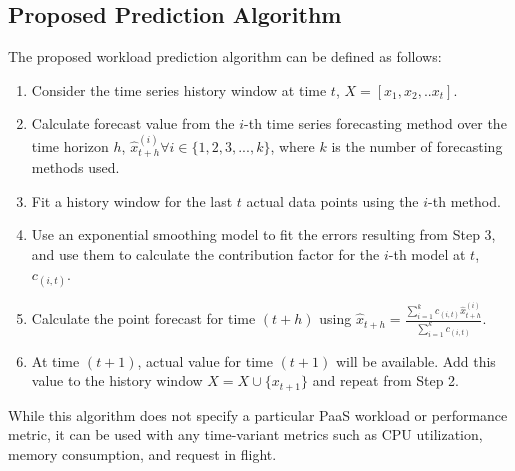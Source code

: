 \subsection{Proposed Prediction Algorithm}
The proposed workload prediction algorithm can be defined as follows:
\begin{enumerate}
\item Consider the time series history window at time $t$, $X=[x_{1},x_{2},.. x_{t}]$.
\item Calculate forecast value from the $i$-th time series forecasting method over the time horizon $h$, $\hat{x}_{t+h}^{(i)} \forall i \in \{1,2,3,...,k\}$, where $k$ is the number of forecasting methods used.
\item Fit a history window for the last $t$ actual data points using the $i$-th method.
\item Use an exponential smoothing model to fit the errors resulting from Step 3, and use them to calculate the contribution factor for the $i$-th model at $t$, $c_{(i,t)}$.
\item Calculate the point forecast for time $(t+h)$ using
$\hat{x}_{t+h}= \frac{\sum_{i=1}^{k}c_{(i,t)} \hat{x}_{t+h}^{(i)}}{\sum_{i=1}^{k}c_{(i,t)}}$.
\item At time $(t+1)$, actual value for time $(t+1)$ will be available. Add this value to the history window $X=X\cup \{x_{t+1}\}$ and repeat from Step 2.
\end{enumerate}
While this algorithm does not specify a particular PaaS workload or performance metric, it can be used with any time-variant metrics such as CPU utilization, memory consumption, and request in flight.\\